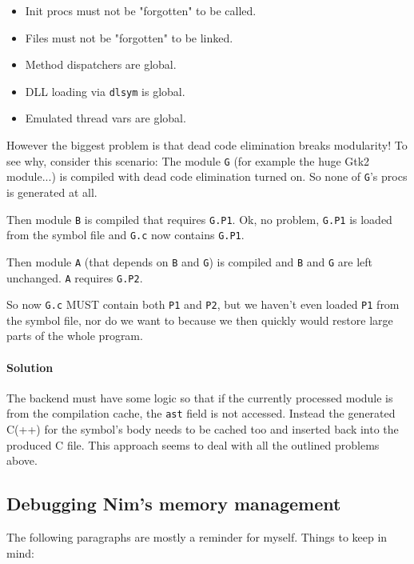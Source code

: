 \begin{itemize}
\tightlist
\item
  Init procs must not be "forgotten" to be called.
\item
  Files must not be "forgotten" to be linked.
\item
  Method dispatchers are global.
\item
  DLL loading via \texttt{dlsym} is global.
\item
  Emulated thread vars are global.
\end{itemize}

However the biggest problem is that dead code elimination breaks
modularity! To see why, consider this scenario: The module \texttt{G}
(for example the huge Gtk2 module...) is compiled with dead code
elimination turned on. So none of \texttt{G}'s procs is generated at
all.

Then module \texttt{B} is compiled that requires \texttt{G.P1}. Ok, no
problem, \texttt{G.P1} is loaded from the symbol file and \texttt{G.c}
now contains \texttt{G.P1}.

Then module \texttt{A} (that depends on \texttt{B} and \texttt{G}) is
compiled and \texttt{B} and \texttt{G} are left unchanged. \texttt{A}
requires \texttt{G.P2}.

So now \texttt{G.c} MUST contain both \texttt{P1} and \texttt{P2}, but
we haven't even loaded \texttt{P1} from the symbol file, nor do we want
to because we then quickly would restore large parts of the whole
program.

\hypertarget{solution}{%
\paragraph{Solution}\label{solution}}

The backend must have some logic so that if the currently processed
module is from the compilation cache, the \texttt{ast} field is not
accessed. Instead the generated C(++) for the symbol's body needs to be
cached too and inserted back into the produced C file. This approach
seems to deal with all the outlined problems above.

\hypertarget{debugging-nims-memory-management}{%
\subsection{Debugging Nim's memory
management}\label{debugging-nims-memory-management}}

The following paragraphs are mostly a reminder for myself. Things to
keep in mind:

